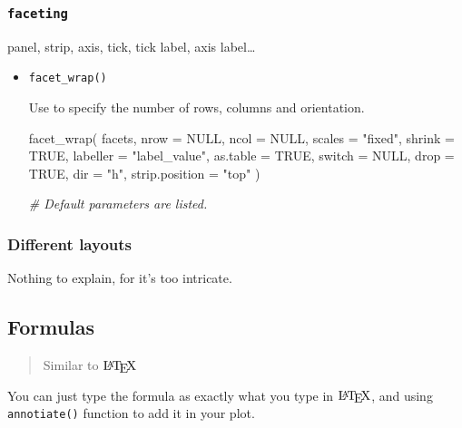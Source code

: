 \documentclass[
]{article}
\newenvironment{Shaded}{}{}
\newcommand{\AttributeTok}[1]{\textcolor[rgb]{0.49,0.56,0.16}{#1}}
\newcommand{\CommentTok}[1]{\textcolor[rgb]{0.38,0.63,0.69}{\textit{#1}}}
\newcommand{\ConstantTok}[1]{\textcolor[rgb]{0.53,0.00,0.00}{#1}}
\newcommand{\FunctionTok}[1]{\textcolor[rgb]{0.02,0.16,0.49}{#1}}
\newcommand{\NormalTok}[1]{#1}
\newcommand{\StringTok}[1]{\textcolor[rgb]{0.25,0.44,0.63}{#1}}
\begin{document}
\hypertarget{faceting}{%
\subsubsection{\texorpdfstring{\texttt{faceting}}{faceting}}\label{faceting}}

panel, strip, axis, tick, tick label, axis label\ldots{}

\begin{itemize}
\item
  \texttt{facet\_wrap()}

  Use to specify the number of rows, columns and orientation.

\begin{Shaded}
\begin{Highlighting}[]
\FunctionTok{facet\_wrap}\NormalTok{(}
\NormalTok{  facets,}
  \AttributeTok{nrow =} \ConstantTok{NULL}\NormalTok{,}
  \AttributeTok{ncol =} \ConstantTok{NULL}\NormalTok{,}
  \AttributeTok{scales =} \StringTok{"fixed"}\NormalTok{,}
  \AttributeTok{shrink =} \ConstantTok{TRUE}\NormalTok{,}
  \AttributeTok{labeller =} \StringTok{"label\_value"}\NormalTok{,}
  \AttributeTok{as.table =} \ConstantTok{TRUE}\NormalTok{,}
  \AttributeTok{switch =} \ConstantTok{NULL}\NormalTok{,}
  \AttributeTok{drop =} \ConstantTok{TRUE}\NormalTok{,}
  \AttributeTok{dir =} \StringTok{"h"}\NormalTok{,}
  \AttributeTok{strip.position =} \StringTok{"top"}
\NormalTok{)}

\CommentTok{\# Default parameters are listed.}
\end{Highlighting}
\end{Shaded}
\end{itemize}

\hypertarget{different-layouts}{%
\subsubsection{Different layouts}\label{different-layouts}}

Nothing to explain, for it's too intricate.

\hypertarget{formulas}{%
\subsection{Formulas}\label{formulas}}

\begin{quote}
Similar to \($\LaTeX$\)
\end{quote}

You can just type the formula as exactly what you type in \($\LaTeX$\),
and using \texttt{annotiate()} function to add it in your plot.
\end{document}
